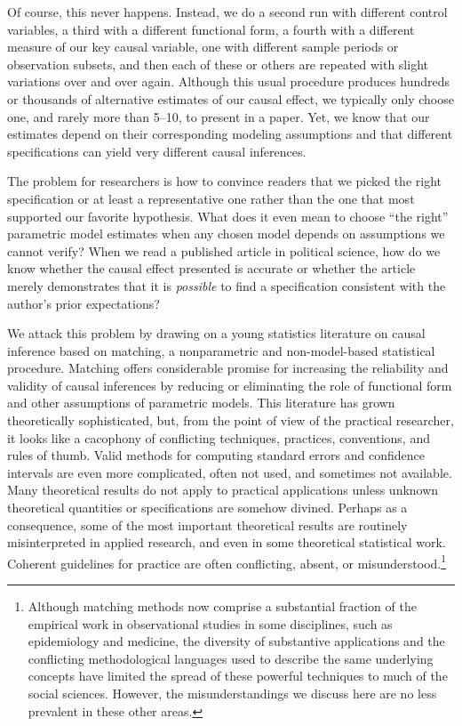 \documentclass[11pt,titlepage]{article}
\begin{document}
Of course, this never happens.  Instead, we do a second run with
different control variables, a third with a different functional form,
a fourth with a different measure of our key causal variable, one with
different sample periods or observation subsets, and then each of
these or others are repeated with slight variations over and over
again.  Although this usual procedure produces hundreds or thousands
of alternative estimates of our causal effect, we typically only
choose one, and rarely more than 5--10, to present in a paper.  Yet,
we know that our estimates depend on their corresponding modeling
assumptions and that different specifications can yield very different
causal inferences.

The problem for researchers is how to convince readers that we picked
the right specification or at least a representative one rather than
the one that most supported our favorite hypothesis.  What does it
even mean to choose ``the right'' parametric model estimates when any
chosen model depends on assumptions we cannot verify?  When we read a
published article in political science, how do we know whether the
causal effect presented is accurate or whether the article merely
demonstrates that it is \emph{possible} to find a specification
consistent with the author's prior expectations?

We attack this problem by drawing on a young statistics literature on
causal inference based on matching, a nonparametric and
non-model-based statistical procedure.  Matching offers considerable
promise for increasing the reliability and validity of causal
inferences by reducing or eliminating the role of functional form and
other assumptions of parametric models.  This literature has grown
theoretically sophisticated, but, from the point of view of the
practical researcher, it looks like a cacophony of conflicting
techniques, practices, conventions, and rules of thumb.  Valid methods
for computing standard errors and confidence intervals are even more
complicated, often not used, and sometimes not available.  Many
theoretical results do not apply to practical applications unless
unknown theoretical quantities or specifications are somehow divined.
Perhaps as a consequence, some of the most important theoretical
results are routinely misinterpreted in applied research, and even in
some theoretical statistical work.  Coherent guidelines for practice
are often conflicting, absent, or misunderstood.\footnote{Although
  matching methods now comprise a substantial fraction of the
  empirical work in observational studies in some disciplines, such as
  epidemiology and medicine, the diversity of substantive applications
  and the conflicting methodological languages used to describe the
  same underlying concepts have limited the spread of these powerful
  techniques to much of the social sciences.  However, the
  misunderstandings we discuss here are no less prevalent in these
  other areas.}
\end{document}
